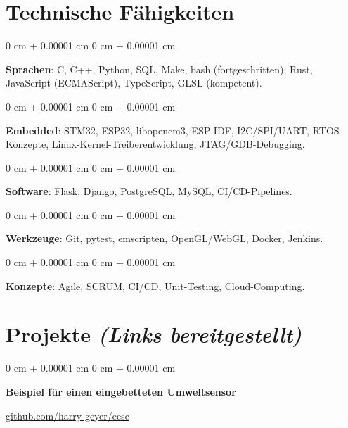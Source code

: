 \documentclass[10pt, letterpaper]{article}
\newenvironment{onecolentry}{
    \begin{adjustwidth}{
        0 cm + 0.00001 cm
    }{
        0 cm + 0.00001 cm
    }
}{
    \end{adjustwidth}
}
\newenvironment{twocolentry}[2][]{
    \onecolentry
    \def\secondColumn{#2}
    \setcolumnwidth{\fill, 4.75 cm}
    \begin{paracol}{2}
}{
    \switchcolumn \raggedleft \secondColumn
    \end{paracol}
    \endonecolentry
}
\begin{document}
    \newpage

    \section{Technische Fähigkeiten}

        \begin{onecolentry}
            \textbf{Sprachen}: C, C++, Python, SQL, Make, bash (fortgeschritten); Rust, JavaScript (ECMAScript), TypeScript, GLSL (kompetent).
        \end{onecolentry}

        \vspace{0.2 cm}

        \begin{onecolentry}
            \textbf{Embedded}: STM32, ESP32, libopencm3, ESP-IDF, I2C/SPI/UART, RTOS-Konzepte, Linux-Kernel-Treiberentwicklung, JTAG/GDB-Debugging.
        \end{onecolentry}

        \vspace{0.2 cm}

        \begin{onecolentry}
            \textbf{Software}: Flask, Django, PostgreSQL, MySQL, CI/CD-Pipelines.
        \end{onecolentry}

        \vspace{0.2 cm}

        \begin{onecolentry}
            \textbf{Werkzeuge}: Git, pytest, emscripten, OpenGL/WebGL, Docker, Jenkins.
        \end{onecolentry}

        \vspace{0.2 cm}

        \begin{onecolentry}
            \textbf{Konzepte}: Agile, SCRUM, CI/CD, Unit-Testing, Cloud-Computing.
        \end{onecolentry}

        \vspace{0.15 cm}

    \section{Projekte \textit{(Links bereitgestellt)}}

        \begin{twocolentry}{\href{https://github.com/harry-geyer/eese}{github.com/harry-geyer/eese}}
            \textbf{Beispiel für einen eingebetteten Umweltsensor}
        \end{twocolentry}
\end{document}
